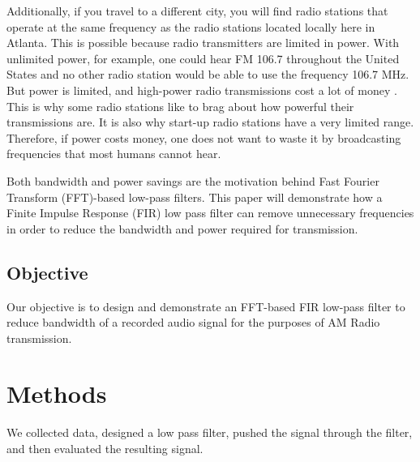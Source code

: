 Additionally, if you travel to a different city, you will find
radio stations that operate at the same frequency as the radio
stations located locally here in Atlanta. This is possible
because radio transmitters are limited in power. With unlimited
power, for example, one could hear FM 106.7 throughout the United
States and no other radio station would be able to use the
frequency 106.7 MHz. But power is limited, and high-power radio
transmissions cost a lot of money \cite{notes:class}. This is why
some radio stations like to brag about how powerful their
transmissions are. It is also why start-up radio stations have a
very limited range. Therefore, if power costs money, one does not
want to waste it by broadcasting frequencies that most humans
cannot hear.

Both bandwidth and power savings are the motivation behind Fast
Fourier Transform (FFT)-based low-pass filters. This paper will
demonstrate how a Finite Impulse Response (FIR) low pass filter
can remove unnecessary frequencies in order to reduce the
bandwidth and power required for transmission.  

\subsection{Objective}

Our objective is to design and demonstrate an FFT-based FIR
low-pass filter to reduce bandwidth of a recorded audio signal
for the purposes of AM Radio transmission.

\section{Methods}

We collected data, designed a low pass filter, pushed the signal
through the filter, and then evaluated the resulting signal.







